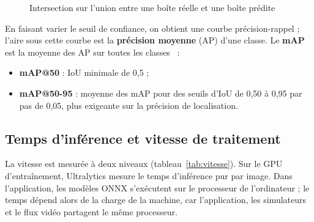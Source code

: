 \begin{figure}[H]
\centering
{}
\caption{Intersection sur l'union entre une boîte réelle et une boîte prédite}
\label{fig:iou}
\end{figure}

En faisant varier le seuil de confiance, on obtient une courbe précision-rappel ; l'aire sous cette courbe est la
\textbf{précision moyenne} (AP) d'une classe. Le \textbf{mAP} est la moyenne des AP sur toutes les
classes~\cite{everingham2010voc,padilla2020metrics} :
\begin{itemize}
  \item \textbf{mAP@50} : IoU minimale de 0,5 ;
  \item \textbf{mAP@50-95} : moyenne des mAP pour des seuils d'IoU de 0,50 à 0,95 par pas de 0,05, plus exigeante
        sur la précision de localisation.
\end{itemize}

\subsection{Temps d'inférence et vitesse de traitement}
La vitesse est mesurée à deux niveaux (tableau~\ref{tab:vitesse}). Sur le GPU d'entraînement, Ultralytics mesure le
temps d'inférence pur par image. Dans l'application, les modèles ONNX s'exécutent sur le processeur de
l'ordinateur ; le temps dépend alors de la charge de la machine, car l'application, les simulateurs et le flux
vidéo partagent le même processeur.

